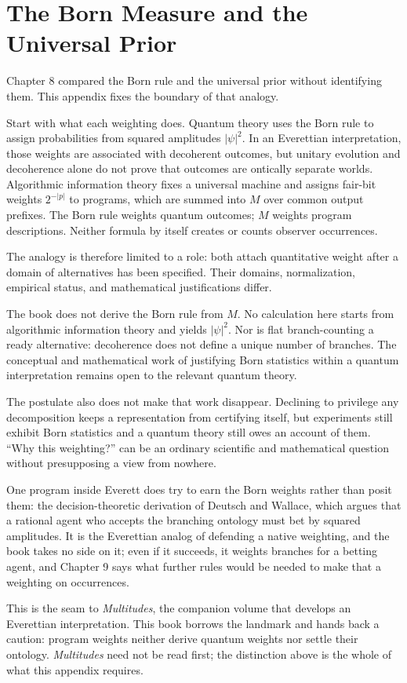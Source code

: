\chapter{The Born Measure and the Universal Prior}\label{app:born}

Chapter 8 compared the Born rule and the universal prior without identifying them. This appendix fixes the boundary of that analogy.

Start with what each weighting does. Quantum theory uses the Born rule to assign probabilities from squared amplitudes $|\psi|^2$. In an Everettian interpretation, those weights are associated with decoherent outcomes, but unitary evolution and decoherence alone do not prove that outcomes are ontically separate worlds. Algorithmic information theory fixes a universal machine and assigns fair-bit weights $2^{-|p|}$ to programs, which are summed into $M$ over common output prefixes. The Born rule weights quantum outcomes; $M$ weights program descriptions. Neither formula by itself creates or counts observer occurrences.

The analogy is therefore limited to a role: both attach quantitative weight after a domain of alternatives has been specified. Their domains, normalization, empirical status, and mathematical justifications differ.

The book does not derive the Born rule from $M$. No calculation here starts from algorithmic information theory and yields $|\psi|^2$. Nor is flat branch-counting a ready alternative: decoherence does not define a unique number of branches. The conceptual and mathematical work of justifying Born statistics within a quantum interpretation remains open to the relevant quantum theory.

The postulate also does not make that work disappear. Declining to privilege any decomposition keeps a representation from certifying itself, but experiments still exhibit Born statistics and a quantum theory still owes an account of them. ``Why this weighting?'' can be an ordinary scientific and mathematical question without presupposing a view from nowhere.

One program inside Everett does try to earn the Born weights rather than posit them: the decision-theoretic derivation of Deutsch and Wallace, which argues that a rational agent who accepts the branching ontology must bet by squared amplitudes. It is the Everettian analog of defending a native weighting, and the book takes no side on it; even if it succeeds, it weights branches for a betting agent, and Chapter 9 says what further rules would be needed to make that a weighting on occurrences.

This is the seam to \textit{Multitudes}, the companion volume that develops an Everettian interpretation. This book borrows the landmark and hands back a caution: program weights neither derive quantum weights nor settle their ontology. \textit{Multitudes} need not be read first; the distinction above is the whole of what this appendix requires.
